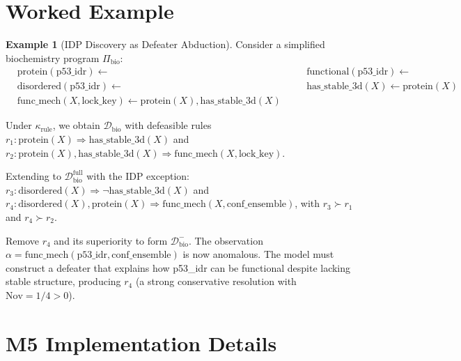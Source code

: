 \documentclass{article}
\theoremstyle{definition}
\newtheorem{example}[theorem]{Example}
\newcommand{\D}{\mathcal{D}}
\newcommand{\Dm}{\mathcal{D}^{-}}
\newcommand{\Dfull}{\mathcal{D}^{\mathrm{full}}}
\newcommand{\partfunc}{\kappa}
\newcommand{\Nov}{\mathrm{Nov}}
\newcommand{\defto}{\Rightarrow}
\begin{document}
\section{Worked Example}\label{app:example}

\begin{example}[IDP Discovery as Defeater Abduction]\label{ex:idp}
Consider a simplified biochemistry program $\Pi_{\mathrm{bio}}$:
\begin{align*}
    &\text{protein}(\text{p53\_idr}) \leftarrow &\quad &\text{functional}(\text{p53\_idr}) \leftarrow \\
    &\text{disordered}(\text{p53\_idr}) \leftarrow &\quad &\text{has\_stable\_3d}(X) \leftarrow \text{protein}(X) \\
    &\text{func\_mech}(X, \text{lock\_key}) \leftarrow \text{protein}(X), \text{has\_stable\_3d}(X)
\end{align*}

Under $\partfunc_{\mathrm{rule}}$, we obtain $\D_{\mathrm{bio}}$ with defeasible rules $r_1\colon \text{protein}(X) \defto \text{has\_stable\_3d}(X)$ and $r_2\colon \text{protein}(X), \text{has\_stable\_3d}(X) \defto \text{func\_mech}(X, \text{lock\_key})$.

Extending to $\Dfull_{\mathrm{bio}}$ with the IDP exception: $r_3\colon \text{disordered}(X) \defto \neg\text{has\_stable\_3d}(X)$ and $r_4\colon \text{disordered}(X), \text{protein}(X) \defto \text{func\_mech}(X, \text{conf\_ensemble})$, with $r_3 \succ r_1$ and $r_4 \succ r_2$.

Remove $r_4$ and its superiority to form $\Dm_{\mathrm{bio}}$. The observation $\alpha = \text{func\_mech}(\text{p53\_idr}, \text{conf\_ensemble})$ is now anomalous. The model must construct a defeater that explains how p53\_idr can be functional despite lacking stable structure, producing $r_4$ (a strong conservative resolution with $\Nov = 1/4 > 0$).
\end{example}


\section{M5 Implementation Details}\label{app:m5details}
\end{document}
